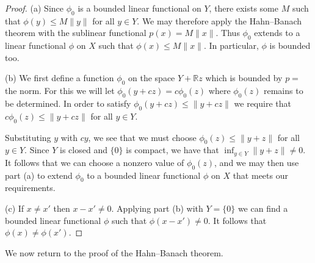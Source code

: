 \documentclass[11pt,oneside]{amsbook}
\newcommand{\RR}{{\mathbb R}}
\theoremstyle{definition}
\theoremstyle{plain}
\theoremstyle{definition}
\theoremstyle{remark}
\numberwithin{equation}{section}
\numberwithin{figure}{section}
\begin{document}
\begin{proof}
  (a) Since $\phi_0$ is a bounded linear functional on $Y$, there exists some $M$ such that $\phi(y)\leq M\|y\|$ for all $y\in Y$. We may therefore apply the Hahn--Banach theorem with the sublinear functional $p(x)=M\|x\|$. Thus $\phi_0$ extends to a linear functional $\phi$ on $X$ such that $\phi(x)\leq M\|x\|$. In particular, $\phi$ is bounded too.

  (b) We first define a function $\phi_0$ on the space $Y+\RR z$ which is bounded by $p=$ the norm. For this we will let $\phi_0(y+cz)=c\phi_0(z)$ where $\phi_0(z)$ remains to be determined. In order to satisfy $\phi_0(y+cz)\leq\|y+cz\|$ we require that $c\phi_0(z)\leq\|y+cz\|$ for all $y\in Y$.

  Substituting $y$ with $cy$, we see that we must choose $\phi_0(z)\leq\|y+z\|$ for all $y\in Y$. Since $Y$ is closed and $\{0\}$ is compact, we have that $\inf_{y\in Y}\|y+z\|\neq0$. It follows that we can choose a nonzero value of $\phi_0(z)$, and we may then use part (a) to extend $\phi_0$ to a bounded linear functional $\phi$ on $X$ that meets our requirements.

  (c) If $x\neq x'$ then $x-x'\neq0$. Applying part (b) with $Y=\{0\}$ we can find a bounded linear functional $\phi$ such that $\phi(x-x')\neq0$. It follows that $\phi(x)\neq\phi(x')$.
\end{proof}

We now return to the proof of the Hahn--Banach theorem.
\end{document}
